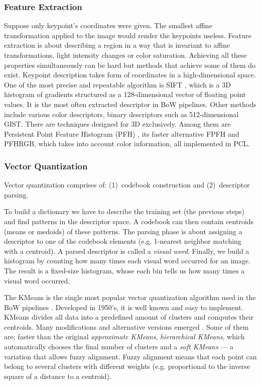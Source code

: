 \documentclass[12pt]{article}
\begin{document}
  \subsubsection{Feature Extraction}
    Suppose only keypoint's coordinates were given. The smallest affine 
transformation applied to the image would render the keypoints useless. Feature 
extraction is about describing a region in a way that is invariant to affine 
transformations, light intensity changes or color saturation. Achieving all 
these properties simultaneously can be hard but methods that achieve some of 
them do exist. Keypoint description takes form of coordinates in a 
high-dimensional space. One of the most precise and repeatable algorithm is 
SIFT \cite{sift_features}, which is a 3D histogram of gradients structured as a 
128-dimensional vector of floating point values. It is the most often extracted 
descriptor in BoW pipelines. Other methods include various color descriptors, 
binary descriptors such as 512-dimensional GIST. There are 
techniques designed for 3D exclusively. Among them are Persistent Point Feature 
Histogram (PFH) , its faster alternative FPFH 
 and PFHRGB, which takes into account color information, 
all implemented in PCL.
    
  \subsubsection{Vector Quantization}
    Vector quantization comprises of: (1)~codebook construction and 
(2)~descriptor parsing. 

To build a dictionary we have to describe the training set (the previous steps) 
and find patterns in the descriptor space. A codebook can then contain 
centroids (means or medoids) of these patterns. The parsing phase is about 
assigning a descriptor to one of the codebook elements (e.g. 1-nearest 
neighbor matching with a centroid). A parsed descriptor is called a 
\textit{visual word}. Finally, we build a histogram by counting how many times 
each visual word occurred for an image. The result is a fixed-size histogram, 
whose each bin tells us how many times a visual word occurred.

    The KMeans is the single most popular vector quantization algorithm used in 
the BoW pipelines \cite{tsai2012bag}. Developed in 1950's, it is well known and 
easy to implement. KMeans divides all data into a predefined amount of clusters 
and computes their centroids. Many modifications and alternative versions 
emerged \cite{kmeans_jain2010data}. Some of them are: faster than the original 
\emph{approximate KMeans}, \emph{hierarchical KMeans}, which automatically 
chooses the final number of clusters and a \emph{soft KMeans} --- a variation 
that allows fuzzy alignment. Fuzzy alignment means that each point can belong 
to several clusters with different weights (e.g. proportional to the inverse 
square of a distance to a centroid). 
    
\end{document}
